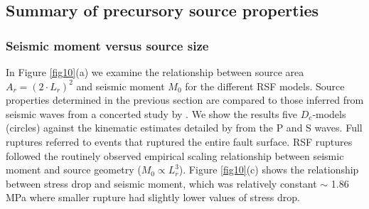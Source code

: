 \documentclass[preprint,1p, 10pt,authoryear]{elsarticle}
\begin{document}
\subsection{Summary of precursory source properties}
\subsubsection{Seismic moment versus source size}
In Figure \ref{fig10}(a) we examine the relationship between source area $A_{r} = (2\cdot L_{r})^{2}$ and seismic moment $M_{0}$ for the different RSF models. Source properties determined in the previous section are compared to those inferred from seismic waves from a concerted study by \citet{Selvadurai2019}. We show the results five $D_{c}$-models (circles) against the kinematic estimates detailed by \citet{Selvadurai2019} from the P and S waves.  Full ruptures referred to events that ruptured the entire fault surface. RSF ruptures followed the routinely observed empirical scaling relationship between seismic moment and source geometry ($M_{0} \propto L_{r}^{3}$). Figure \ref{fig10}(c) shows the relationship between stress drop and seismic moment, which was relatively constant $\sim$ 1.86 MPa where smaller rupture had slightly lower values of stress drop.
\end{document}
